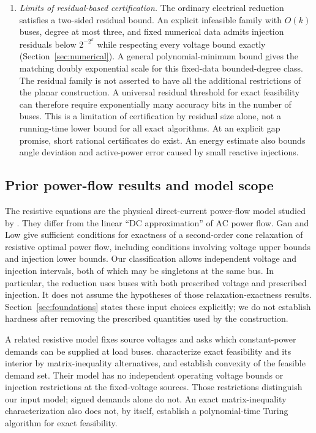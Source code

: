 \begin{enumerate}
\item \emph{Limits of residual-based certification.}
The ordinary electrical reduction satisfies a two-sided residual bound.
An explicit infeasible family with $O(k)$ buses, degree at most three, and
fixed numerical data admits injection residuals below $2^{-2^k}$ while
respecting every voltage bound exactly (Section~\ref{sec:numerical}).
A general polynomial-minimum bound gives the matching doubly exponential
scale for this fixed-data bounded-degree class. The residual family is not
asserted to have all the additional restrictions of the planar construction.
A universal residual threshold for exact feasibility can therefore require
exponentially many accuracy bits in the number of buses. This is a limitation
of certification by residual size alone, not a running-time lower bound for
all exact algorithms. At an explicit gap promise, short rational certificates
do exist. An energy estimate also bounds angle deviation and active-power
error caused by small reactive injections.
\end{enumerate}

\subsection{Prior power-flow results and model scope}

The resistive equations are the physical direct-current power-flow model
studied by \citet{GanLow2014}. They differ from the linear ``DC
approximation'' of AC power flow. Gan and Low give sufficient conditions for
exactness of a second-order cone relaxation of resistive optimal power flow,
including conditions involving voltage upper bounds and injection lower
bounds. Our classification allows independent voltage and injection
intervals, both of which may be singletons at the same bus. In particular,
the reduction uses buses with both prescribed voltage and prescribed
injection. It does not assume the hypotheses of those relaxation-exactness
results. Section~\ref{sec:foundations} states these input choices explicitly;
we do not establish hardness after removing the prescribed quantities used
by the construction.

A related resistive model fixes source voltages and asks which
constant-power demands can be supplied at load buses.
\citet[Theorems 3.18 and 3.22]{JeeningaEtAl2023} characterize exact feasibility and
its interior by matrix-inequality alternatives, and establish convexity of
the feasible demand set. Their model has no independent operating voltage
bounds or injection restrictions at the fixed-voltage sources. Those
restrictions distinguish our input model; signed demands alone do not.
An exact matrix-inequality characterization also does not, by itself,
establish a polynomial-time Turing algorithm for exact feasibility.

